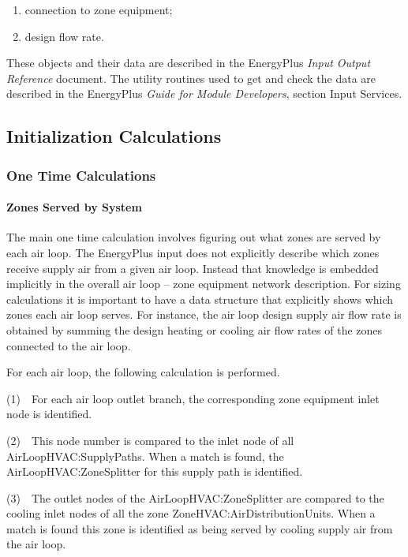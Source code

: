 \begin{enumerate}
\def\labelenumi{\arabic{enumi}.}
\setcounter{enumi}{2}
\item
  connection to zone equipment;
\item
  design flow rate.
\end{enumerate}

These objects and their data are described in the EnergyPlus \emph{Input Output Reference} document. The utility routines used to get and check the data are described in the EnergyPlus \emph{Guide for Module Developers}, section Input Services.

\subsection{Initialization Calculations}\label{initialization-calculations}

\subsubsection{One Time Calculations}\label{one-time-calculations}

\paragraph{Zones Served by System}\label{zones-served-by-system}

The main one time calculation involves figuring out what zones are served by each air loop. The EnergyPlus input does not explicitly describe which zones receive supply air from a given air loop. Instead that knowledge is embedded implicitly in the overall air loop -- zone equipment network description. For sizing calculations it is important to have a data structure that explicitly shows which zones each air loop serves. For instance, the air loop design supply air flow rate is obtained by summing the design heating or cooling air flow rates of the zones connected to the air loop.

For each air loop, the following calculation is performed.

(1)~~For each air loop outlet branch, the corresponding zone equipment inlet node is identified.

(2)~~This node number is compared to the inlet node of all AirLoopHVAC:SupplyPaths. When a match is found, the AirLoopHVAC:ZoneSplitter for this supply path is identified.

(3)~~The outlet nodes of the AirLoopHVAC:ZoneSplitter are compared to the cooling inlet nodes of all the zone ZoneHVAC:AirDistributionUnits. When a match is found this zone is identified as being served by cooling supply air from the air loop.


